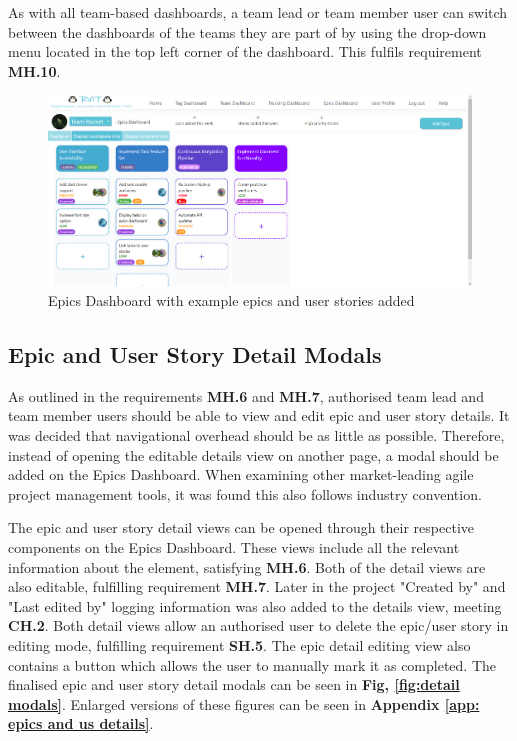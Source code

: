 \documentclass[l4proj.tex]{subfiles}
\begin{document}
As with all team-based dashboards, a team lead or team member user can switch between the dashboards of the teams they are part of by using the drop-down menu located in the top left corner of the dashboard. This fulfils requirement \textbf{MH.10}.

\begin{figure}[h!]
\begin{center}
\includegraphics[scale=0.35]{dissertation/images/EpicsDashboard.png}
\caption{Epics Dashboard with example epics and user stories added}
\label{fig:epics dashboard} 
\end{center}
\end{figure}

\subsection{Epic and User Story Detail Modals}
As outlined in the requirements \textbf{MH.6} and \textbf{MH.7}, authorised team lead and team member users should be able to view and edit epic and user story details. It was decided that navigational overhead should be as little as possible. Therefore, instead of opening the editable details view on another page, a modal should be added on the Epics Dashboard. When examining other market-leading agile project management tools, it was found this also follows industry convention. 

The epic and user story detail views can be opened through their respective components on the Epics Dashboard. These views include all the relevant information about the element, satisfying \textbf{MH.6}. Both of the detail views are also editable, fulfilling requirement \textbf{MH.7}. Later in the project "Created by" and "Last edited by" logging information was also added to the details view, meeting \textbf{CH.2}. Both detail views allow an authorised user to delete the epic/user story in editing mode, fulfilling requirement \textbf{SH.5}. The epic detail editing view also contains a button which allows the user to manually mark it as completed. The finalised epic and user story detail modals can be seen in \textbf{Fig, \ref{fig:detail modals}}. Enlarged versions of these figures can be seen in \textbf{Appendix \ref{app: epics and us details}}.
\end{document}
